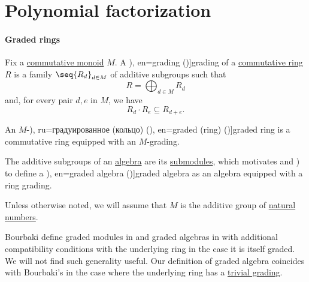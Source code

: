 \section{Polynomial factorization}\label{sec:polynomial_factorization}

\paragraph{Graded rings}

\begin{definition}\label{def:graded_ring}
  Fix a \hyperref[def:monoid/commutative]{commutative monoid} \( M \). A \term[ru=градуировка (\cite[197]{Винберг2014Алгебра}), en=grading (\cite[527]{Aluffi2009Algebra})]{grading} of a \hyperref[def:ring/commutative]{commutative ring} \( R \) is a family \( \seq{ R_d }_{d \in M} \) of additive subgroups such that
  \begin{equation*}
    R = \bigoplus_{d \in M} R_d
  \end{equation*}
  and, for every pair \( d, e \) in \( M \), we have
  \begin{equation}\label{eq:def:graded_ring}
    R_d \cdot R_e \subseteq R_{d + e}.
  \end{equation}

  An \( M \)-\term[bg=градуиран (пръстен) (\cite[56]{КоцевСидеров2016КомАлгебра}), ru=градуированное (кольцо) (\cite[63]{Шафаревич1999Алгебра}), en=graded (ring) (\cite[29]{Eisenbud1995CommAlgebra})]{graded ring} is a commutative ring equipped with an \( M \)-grading.

  The additive subgroups of an \hyperref[def:algebra_over_ring]{algebra} are its \hyperref[def:module/submodel]{submodules}, which motivates  and ) to define a \term[ru=градуированная (алгебра) (\cite[197]{Винберг2014Алгебра}), en=graded algebra (\cite[exerc. B-5.2]{Rotman2015AlgebraPart1})]{graded algebra} as an algebra equipped with a ring grading.

  Unless otherwise noted, we will assume that \( M \) is the additive group of \hyperref[def:natural_numbers]{natural numbers}.
\end{definition}
\begin{comments}
  \item Bourbaki define graded modules in \cite[def. II.11.3]{Bourbaki1998Algebra1to3} and graded algebras in \cite[def. III.3.1]{Bourbaki1998Algebra1to3} with additional compatibility conditions with the underlying ring in the case it is itself graded. We will not find such generality useful. Our definition of graded algebra coincides with Bourbaki's in the case where the underlying ring has a \hyperref[def:trivial_ring_grading]{trivial grading}.
\end{comments}

